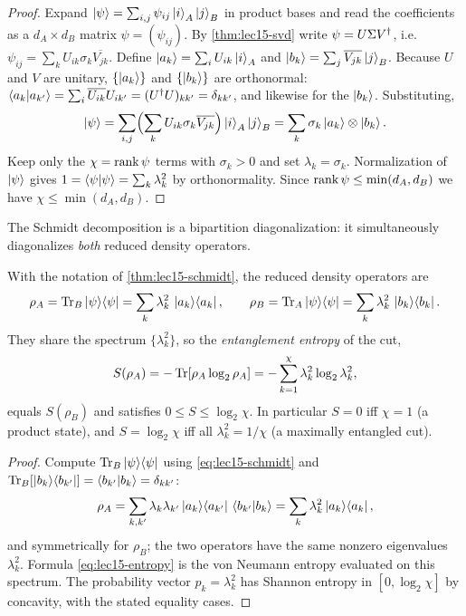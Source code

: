 \begin{proof}
Expand $\ket{\psi}=\sum_{i,j}\psi_{ij}\ket{i}_A\ket{j}_B$ in product bases and
read the coefficients as a $d_A\times d_B$ matrix $\psi=(\psi_{ij})$. By
\cref{thm:lec15-svd} write $\psi=U\Sigma V^{\dagger}$, i.e.
$\psi_{ij}=\sum_k U_{ik}\sigma_k \overline{V_{jk}}$. Define
$\ket{a_k}=\sum_i U_{ik}\ket{i}_A$ and $\ket{b_k}=\sum_j \overline{V_{jk}}\ket{j}_B$.
Because $U$ and $V$ are unitary, $\{\ket{a_k}\}$ and $\{\ket{b_k}\}$ are
orthonormal:
$\braket{a_k|a_{k'}}=\sum_i\overline{U_{ik}}U_{ik'}=(U^{\dagger} U)_{kk'}=\delta_{kk'}$,
and likewise for the $\ket{b_k}$. Substituting,
\[
  \ket{\psi}=\sum_{i,j}\Bigl(\sum_k U_{ik}\sigma_k\overline{V_{jk}}\Bigr)\ket{i}_A\ket{j}_B
    =\sum_k\sigma_k\ket{a_k}\otimes\ket{b_k}.
\]
Keep only the $\chi=\operatorname{rank}\psi$ terms with $\sigma_k>0$ and set $\lambda_k=\sigma_k$.
Normalization of $\ket{\psi}$ gives $1=\braket{\psi|\psi}=\sum_k\lambda_k^{2}$ by
orthonormality. Since $\operatorname{rank}\psi\le\min(d_A,d_B)$ we have $\chi\le\min(d_A,d_B)$.
\end{proof}

The Schmidt decomposition is a bipartition diagonalization: it simultaneously
diagonalizes \emph{both} reduced density operators.

\begin{corollary}\label{cor:lec15-reduced}
With the notation of \cref{thm:lec15-schmidt}, the reduced density operators are
\[
  \rho_A=\operatorname{Tr}_B\ket{\psi}\!\bra{\psi}=\sum_{k}\lambda_k^{2}\,\ket{a_k}\!\bra{a_k},
  \qquad
  \rho_B=\operatorname{Tr}_A\ket{\psi}\!\bra{\psi}=\sum_{k}\lambda_k^{2}\,\ket{b_k}\!\bra{b_k}.
\]
They share the spectrum $\{\lambda_k^{2}\}$, so the \emph{entanglement entropy}
of the cut,
\begin{equation}\label{eq:lec15-entropy}
  S(\rho_A)=-\operatorname{Tr}[\rho_A\log_2\rho_A]=-\sum_{k=1}^{\chi}\lambda_k^{2}\log_2\lambda_k^{2},
\end{equation}
equals $S(\rho_B)$ and satisfies $0\le S\le\log_2\chi$. In particular $S=0$ iff
$\chi=1$ (a product state), and $S=\log_2\chi$ iff all $\lambda_k^{2}=1/\chi$
(a maximally entangled cut).
\end{corollary}

\begin{proof}
Compute $\operatorname{Tr}_B\ket{\psi}\!\bra{\psi}$ using \eqref{eq:lec15-schmidt} and
$\operatorname{Tr}_B[\ket{b_k}\!\bra{b_{k'}}]=\braket{b_{k'}|b_k}=\delta_{kk'}$:
\[
  \rho_A=\sum_{k,k'}\lambda_k\lambda_{k'}\ket{a_k}\!\bra{a_{k'}}\,\braket{b_{k'}|b_k}
        =\sum_k\lambda_k^{2}\ket{a_k}\!\bra{a_k},
\]
and symmetrically for $\rho_B$; the two operators have the same nonzero
eigenvalues $\lambda_k^{2}$. Formula \eqref{eq:lec15-entropy} is the von Neumann
entropy evaluated on this spectrum. The probability vector $p_k=\lambda_k^{2}$ has
Shannon entropy in $[0,\log_2\chi]$ by concavity, with the stated equality cases.
\end{proof}

